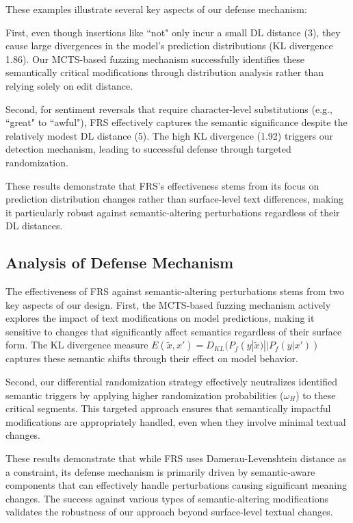 These examples illustrate several key aspects of our defense mechanism:

First, even though insertions like ``not" only incur a small DL distance (3), they cause large divergences in the model's prediction distributions (KL divergence 1.86). Our MCTS-based fuzzing mechanism successfully identifies these semantically critical modifications through distribution analysis rather than relying solely on edit distance.

Second, for sentiment reversals that require character-level substitutions (e.g., ``great" to ``awful"), FRS effectively captures the semantic significance despite the relatively modest DL distance (5). The high KL divergence (1.92) triggers our detection mechanism, leading to successful defense through targeted randomization.

These results demonstrate that FRS's effectiveness stems from its focus on prediction distribution changes rather than surface-level text differences, making it particularly robust against semantic-altering perturbations regardless of their DL distances.

\subsection{Analysis of Defense Mechanism}
The effectiveness of FRS against semantic-altering perturbations stems from two key aspects of our design. First, the MCTS-based fuzzing mechanism actively explores the impact of text modifications on model predictions, making it sensitive to changes that significantly affect semantics regardless of their surface form. The KL divergence measure $E(\tilde{x},x') = D_{KL}(P_f(y|\tilde{x})||P_f(y|x'))$ captures these semantic shifts through their effect on model behavior.

Second, our differential randomization strategy effectively neutralizes identified semantic triggers by applying higher randomization probabilities ($\omega_H$) to these critical segments. This targeted approach ensures that semantically impactful modifications are appropriately handled, even when they involve minimal textual changes.

These results demonstrate that while FRS uses Damerau-Levenshtein distance as a constraint, its defense mechanism is primarily driven by semantic-aware components that can effectively handle perturbations causing significant meaning changes. The success against various types of semantic-altering modifications validates the robustness of our approach beyond surface-level textual changes.

